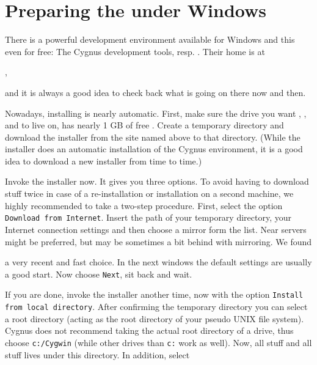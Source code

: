 \section{Preparing the  under Windows\label{preparewin}}

There is a powerful development environment available for Windows and this even for free:
The Cygnus development tools, resp. \Cygwin. Their home
is at
 \medskip

,
 \medskip

 \noindent
and it is always a good idea to check back what is going on there now and then.

Nowadays, installing \Cygwin{} is nearly automatic. First, make sure
the drive you want \Cygwin{}, \PLIB{}, \SimGear{} and \FlightGear{} to live on, has
nearly 1 GB of free . Create a temporary directory and download the
installer from the site named above to that directory. (While the installer does an
automatic installation of the Cygnus environment, it is a good idea to download a new
installer from time to time.)

Invoke the installer now. It gives you three options. To avoid having to download stuff
twice in case of a re-installation or installation on a second machine, we highly
recommended to take a two-step procedure. First, select the option \texttt{Download from
Internet}. Insert the path of your temporary directory, your Internet connection settings
and then choose a mirror form the list. Near servers might be preferred, but may be
sometimes a bit behind with mirroring. We found
\medskip

\medskip

 \noindent
a very recent and fast choice. In the next windows the default settings are usually a
good start. Now choose \texttt{Next}, sit back and wait.

If you are done, invoke the installer another time, now with the option
\texttt{Install from local directory}. After confirming the temporary directory you can
select a root directory (acting as the root directory of your pseudo UNIX file system).
Cygnus does not recommend taking the actual root directory of a drive, thus choose
\texttt{c:/Cygwin}
(while other drives than \texttt{c:} work as well). Now, all \Cygwin{}
stuff and all \FlightGear{} stuff lives under this directory. In
addition, select

